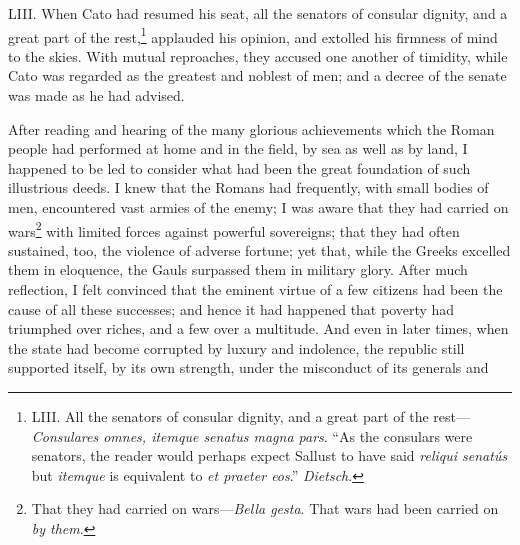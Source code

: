 LIII. When Cato had resumed his seat, all the senators of consular
dignity, and a great part of the rest,\footnote{LIII. All the senators of consular dignity, and a great
part of the rest—\emph{Consulares omnes, itemque senatus magna pars}. ``As
the consulars were senators, the reader would perhaps expect Sallust
to have said \emph{reliqui senatús} but \emph{itemque} is equivalent to \emph{et
praeter eos}.'' \emph{Dietsch}.} applauded his opinion, and
extolled his firmness of mind to the skies. With mutual reproaches,
they accused one another of timidity, while Cato was regarded as the
greatest and noblest of men; and a decree of the senate was made as he
had advised.

After reading and hearing of the many glorious achievements which the
Roman people had performed at home and in the field, by sea as well as
by land, I happened to be led to consider what had been the great
foundation of such illustrious deeds. I knew that the Romans had
frequently, with small bodies of men, encountered vast armies of the
enemy; I was aware that they had carried on wars\footnote{That they had carried on wars—\emph{Bella gesta}. That wars had
been carried on \emph{by them}.} with limited
forces against powerful sovereigns; that they had often sustained,
too, the violence of adverse fortune; yet that, while the Greeks
excelled them in eloquence, the Gauls surpassed them in military
glory. After much reflection, I felt convinced that the eminent virtue
of a few citizens had been the cause of all these successes; and hence
it had happened that poverty had triumphed over riches, and a few over
a multitude. And even in later times, when the state had become
corrupted by luxury and indolence, the republic still supported
itself, by its own strength, under the misconduct of its generals and
